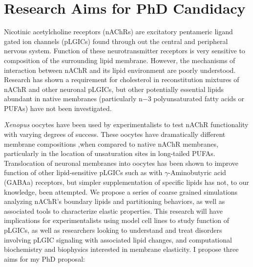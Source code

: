 \documentclass{article}
\begin{document}
\section{Research Aims for PhD Candidacy}

Nicotinic acetylcholine receptors (nAChRs) are excitatory pentameric ligand gated ion channels (pLGICs) found through out the central and peripheral nervous system. Function of these neurotransmitter receptors is very sensitive to composition of the surrounding lipid membrane. However, the mechanisms of interaction between nAChR and its lipid environment are poorly understood. Research has shown a requirement for cholesterol in reconstitution mixtures of nAChR and other neuronal pLGICs, but other potentially essential lipids abundant in native membranes (particularly n−3 polyunsaturated fatty acids or PUFAs) have not been investigated.

\textit{Xenopus} oocytes have been used by experimentalists to test nAChR functionality with varying degrees of success. These oocytes have dramatically different membrane compositions ,when compared to native nAChR membranes, particularly in the location of unsaturation sites in long-tailed PUFAs. Translocation of neuronal membranes into oocytes has been shown to improve function of other lipid-sensitive pLGICs such as with $\gamma$-Aminobutyric acid (GABAa) receptors, but simpler supplementation of specific lipids has not, to our knowledge, been attempted. We propose a series of coarse grained simulations analyzing nAChR’s boundary lipids and partitioning behaviors, as well as associated tools to characterize elastic properties. This research will have implications for experimentalists using model cell lines to study function of pLGICs, as well as researchers looking to understand and treat disorders involving pLGIC signaling with associated lipid changes, and computational biochemistry and biophysics interested in membrane elasticity. I propose three aims for my PhD proposal:
\end{document}
